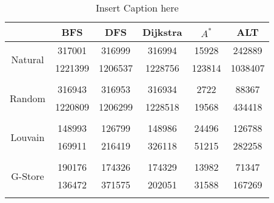 \begin{table}
	\begin{center}
		 \begin{tabular}[c]{c c c c c c} \toprule
			  & BFS & DFS & Dijkstra & $A^*$  & ALT \\ \midrule 
 			\multirow{2}{*}{Natural}  & 317001 & 316999 & 316994 & 15928 & 242889 \\ 
 				 & 1221399 & 1206537 & 1228756 & 123814 & 1038407 \\ 
 				&&&&& \\[-0.5em]
 			\multirow{2}{*}{Random}  & 316943 & 316953 & 316934 & 2722 & 88367 \\ 
 				 & 1220809 & 1206299 & 1228518 & 19568 & 434418 \\ 
 				&&&&& \\[-0.5em]
 			\multirow{2}{*}{Louvain}  & 148993 & 126799 & 148986 & 24496 & 126788 \\ 
 				 & 169911 & 216419 & 326118 & 51215 & 282258 \\ 
 				&&&&& \\[-0.5em]
 			\multirow{2}{*}{G-Store}  & 190176 & 174326 & 174329 & 13982 & 71347 \\ 
 				 & 136472 & 371575 & 202051 & 31588 & 167269 \\ 
 				&&&&& \\[-0.5em]
 					\end{tabular}  
  	 \end{center}
	 \caption{ Insert Caption here}
\end{table}
